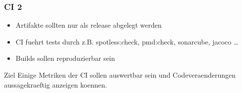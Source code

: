 \begin{frame}
    \frametitle{CI 2}
    \begin{itemize}
      \item Artifakte sollten nur als release abgelegt werden
      \item CI fuehrt tests durch z.B. spotless:check, pmd:check, sonarcube, jacoco \dots
      \item Builds sollen reproduzierbar sein
    \end{itemize}
    \begin{block}{Ziel}
        Einige Metriken der CI sollen auswertbar sein und Codeveraenderungen aussagekraeftig anzeigen koennen.        
    \end{block}
\end{frame}

